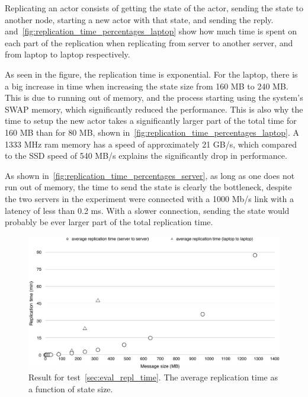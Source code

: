 \documentclass{cslthse-msc}
\begin{document}
Replicating an actor consists of getting the state of the actor, sending the state to another node, starting a new actor with that state, and sending the reply.  and~\cref{fig:replication_time_percentages_laptop} show how much time is spent on each part of the replication when replicating from server to another server, and from laptop to laptop respectively.

As seen in the figure, the replication time is exponential. For the laptop, there is a big increase in time when increasing the state size from 160 MB to 240 MB. This is due to running out of memory, and the process starting using the system's SWAP memory, which significantly reduced the performance. This is also why the time to setup the new actor takes a significantly larger part of the total time for 160 MB than for 80 MB, shown in~\cref{fig:replication_time_percentages_laptop}. A 1333 MHz ram memory has a speed of approximately 21 GB/s, which compared to the SSD speed of 540 MB/s explains the significantly drop in performance.

As shown in~\cref{fig:replication_time_percentages_server}, as long as one does not run out of memory, the time to send the state is clearly the bottleneck, despite the two servers in the experiment were connected with a 1000 Mb/s link with a latency of less than 0.2 ms. With a slower connection, sending the state would probably be ever larger part of the total replication time.


\begin{figure}[!hbt]
\centering
\includegraphics[scale=0.5]{images/results/replication_time.pdf} 
\caption{Result for test~\ref{sec:eval_repl_time}. The average replication time as a function of state size.}\label{fig:replication_time}
\end{figure}
\end{document}
